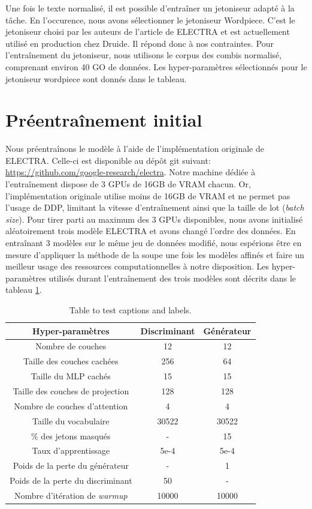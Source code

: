 \documentclass[12pt,twoside,maitrise]{dms}
\theoremstyle{definition}
\numberwithin{equation}{section}
\numberwithin{table}{chapter}
\numberwithin{figure}{chapter}
\begin{document}
Une fois le texte normalisé, il est possible d'entraîner un jetoniseur adapté à
la tâche. En l'occurence, nous avons sélectionner le jetoniseur Wordpiece.
C'est le jetoniseur choisi par les auteurs de l'article de ELECTRA et est
actuellement utilisé en production chez Druide. Il répond donc à nos
contraintes. Pour l'entraînement du jetoniseur, nous utilisons le corpus des
combis normalisé, comprenant environ 40 GO de données. Les hyper-paramètres
sélectionnés pour le jetoniseur wordpiece sont donnés dans le tableau.\\

\section{Préentraînement initial}
Nous préentraînons le modèle à l'aide de l'implémentation originale de ELECTRA.
Celle-ci est disponible au dépôt git suivant:
\url{https://github.com/google-research/electra}. Notre machine dédiée à
l'entraînement dispose de 3 GPUs de 16GB de VRAM chacun. Or, l'implémentation
originale utilise moins de 16GB de VRAM et ne permet pas l'usage de DDP,
limitant la vitesse d'entraînement ainsi que la taille de lot (\textit{batch
size}). Pour tirer parti au maximum des 3 GPUs disponibles, nous avons
initialisé aléatoirement trois modèle ELECTRA et avons changé l'ordre des
données. En entraînant 3 modèles sur le même jeu de données modifié, nous
espérions être en mesure d'appliquer la méthode de la soupe \cite{soup} une
fois les modèles affinés et faire un meilleur usage des ressources
computationnelles à notre disposition. Les hyper-paramètres utilisés durant
l'entraînement des trois modèles sont décrits dans le tableau \ref{table:1}.


\begin{table}[h!]
\centering
\begin{tabular}{||c | c c||}
 \hline
 Hyper-paramètres & Discriminant & Générateur \\ [0.5ex]
 \hline\hline
 Nombre de couches  & 12 & 12 \\
 Taille des couches cachées & 256 & 64 \\
 Taille du MLP cachés & 15 & 15 \\
 Taille des couches de projection & 128 & 128 \\
 Nombre de couches d'attention & 4 & 4 \\
 Taille du vocabulaire & 30522 & 30522 \\
 \% des jetons masqués & - & 15 \\
 Taux d'apprentissage & 5e-4 & 5e-4 \\
 Poids de la perte du générateur & - & 1 \\
 Poids de la perte du discriminant & 50 & - \\
 Nombre d'itération de \textit{warmup} & 10000 & 10000\\
 \hline
\end{tabular}
\caption{Table to test captions and labels.}
\label{table:1}
\end{table}
\end{document}
